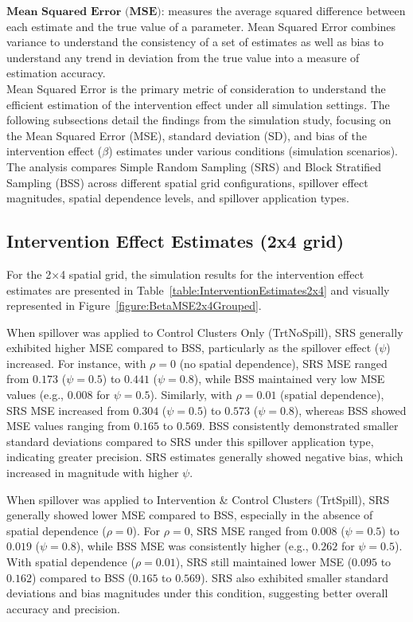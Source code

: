 \documentclass{article}[11pt]
\begin{document}
\noindent $\textbf{Mean Squared Error (MSE)}$: measures the average squared difference between each estimate and the true value of a parameter. Mean Squared Error combines variance to understand the consistency of a set of estimates as well as bias to understand any trend in deviation from the true value into a measure of estimation accuracy.\\

Mean Squared Error is the primary metric of consideration to understand the efficient estimation of the intervention effect under all simulation settings. The following subsections detail the findings from the simulation study, focusing on the Mean Squared Error (MSE), standard deviation (SD), and bias of the intervention effect ($\beta$) estimates under various conditions (simulation scenarios). The analysis compares Simple Random Sampling (SRS) and Block Stratified Sampling (BSS) across different spatial grid configurations, spillover effect magnitudes, spatial dependence levels, and spillover application types.

\subsection{Intervention Effect Estimates (2x4 grid)}

For the 2×4 spatial grid, the simulation results for the intervention effect estimates are presented in Table~\ref{table:InterventionEstimates2x4} and visually represented in Figure~\ref{figure:BetaMSE2x4Grouped}.

When spillover was applied to Control Clusters Only (TrtNoSpill), SRS generally exhibited higher MSE compared to BSS, particularly as the spillover effect ($\psi$) increased. For instance, with $\rho=0$ (no spatial dependence), SRS MSE ranged from $0.173$ ($\psi=0.5$) to $0.441$ ($\psi=0.8$), while BSS maintained very low MSE values (e.g., $0.008$ for $\psi=0.5$). Similarly, with $\rho=0.01$ (spatial dependence), SRS MSE increased from $0.304$ ($\psi=0.5$) to $0.573$ ($\psi=0.8$), whereas BSS showed MSE values ranging from $0.165$ to $0.569$. BSS consistently demonstrated smaller standard deviations compared to SRS under this spillover application type, indicating greater precision. SRS estimates generally showed negative bias, which increased in magnitude with higher $\psi$.

When spillover was applied to Intervention \& Control Clusters (TrtSpill), SRS generally showed lower MSE compared to BSS, especially in the absence of spatial dependence ($\rho=0$). For $\rho=0$, SRS MSE ranged from $0.008$ ($\psi=0.5$) to $0.019$ ($\psi=0.8$), while BSS MSE was consistently higher (e.g., $0.262$ for $\psi=0.5$). With spatial dependence ($\rho=0.01$), SRS still maintained lower MSE ($0.095$ to $0.162$) compared to BSS ($0.165$ to $0.569$). SRS also exhibited smaller standard deviations and bias magnitudes under this condition, suggesting better overall accuracy and precision.
\end{document}
